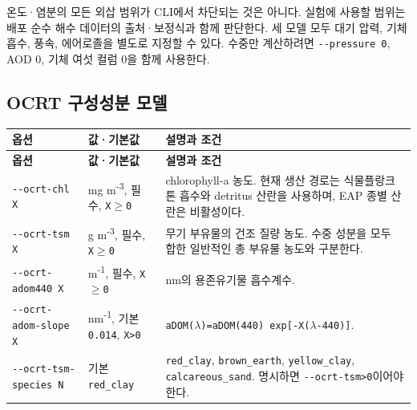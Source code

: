 온도·염분의 모든 외삽 범위가 CLI에서 차단되는 것은 아니다. 실험에 사용할 범위는 배포 순수 해수 데이터의 출처·보정식과 함께 판단한다. 세 모델 모두 대기 압력, 기체흡수, 풍속, 에어로졸을 별도로 지정할 수 있다. 수중만 계산하려면 \texttt{-\allowbreak{}-\allowbreak{}pressure 0}, AOD 0, 기체 여섯 컬럼 0을 함께 사용한다.

\subsection{OCRT 구성성분 모델}
\label{sec:auto:03_options:5.1}

{\TableFont
\begin{longtable}{@{}>{\raggedright\arraybackslash}p{}>{\raggedright\arraybackslash}p{}>{\raggedright\arraybackslash}p{}@{}}
\toprule
\textbf{옵션} & \textbf{값·기본값} & \textbf{설명과 조건} \\
\midrule
\endfirsthead
\toprule
\textbf{옵션} & \textbf{값·기본값} & \textbf{설명과 조건} \\
\midrule
\endhead
\bottomrule
\endfoot
\texttt{-\allowbreak{}-\allowbreak{}ocrt-\allowbreak{}chl X} & mg m\textsuperscript{-}\textsuperscript{3}, 필수, \texttt{X\ensuremath{\geq}0} & chlorophyll-a 농도. 현재 생산 경로는 식물플랑크톤 흡수와 detritus 산란을 사용하며, EAP 종별 산란은 비활성이다. \\
\texttt{-\allowbreak{}-\allowbreak{}ocrt-\allowbreak{}tsm X} & g m\textsuperscript{-}\textsuperscript{3}, 필수, \texttt{X\ensuremath{\geq}0} & 무기 부유물의 건조 질량 농도. 수중 성분을 모두 합한 일반적인 총 부유물 농도와 구분한다. \\
\texttt{-\allowbreak{}-\allowbreak{}ocrt-\allowbreak{}adom440 X} & m\textsuperscript{-}\textsuperscript{1}, 필수, \texttt{X\ensuremath{\geq}0} & 440 nm의 용존유기물 흡수계수. \\
\texttt{-\allowbreak{}-\allowbreak{}ocrt-\allowbreak{}adom-\allowbreak{}slope X} & nm\textsuperscript{-}\textsuperscript{1}, 기본 \texttt{0.\allowbreak{}014}, \texttt{X>0} & \texttt{aDOM(\ensuremath{\lambda})=\allowbreak{}aDOM(440) exp[-\allowbreak{}X(\ensuremath{\lambda}-440)]}. \\
\texttt{-\allowbreak{}-\allowbreak{}ocrt-\allowbreak{}tsm-\allowbreak{}species N} & 기본 \texttt{red\_\allowbreak{}clay} & \texttt{red\_\allowbreak{}clay}, \texttt{brown\_\allowbreak{}earth}, \texttt{yellow\_\allowbreak{}clay}, \texttt{calcareous\_\allowbreak{}sand}. 명시하면 \texttt{-\allowbreak{}-\allowbreak{}ocrt-\allowbreak{}tsm>0}이어야 한다. \\

\end{longtable}}
